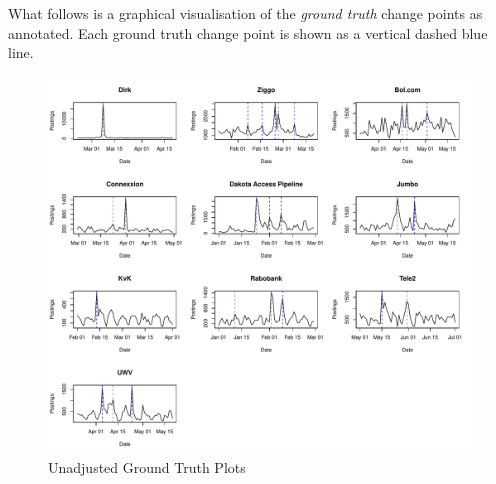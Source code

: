 \documentclass[../main.tex]{subfiles}
\begin{document}
What follows is a graphical visualisation of the \emph{ground truth} change points as annotated. Each ground truth change point is shown as a vertical dashed blue line.

\begin{figure}[h]
    \includegraphics[width=\textwidth]{figures/GroundTruthAnnotations}
    \caption{Unadjusted Ground Truth Plots}
    \label{fig:truth1}
\end{figure}
\end{document}
